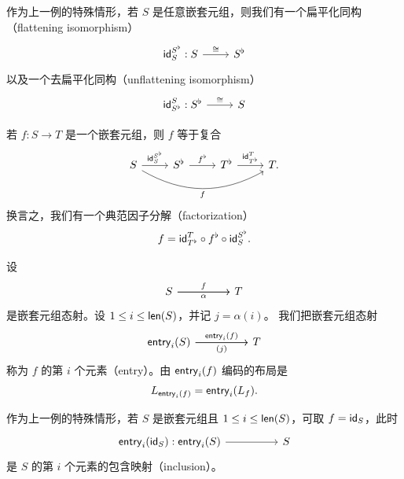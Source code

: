 \begin{example}[扁平化]\label{definitionofflatteningisomorphisms}
    作为上一例的特殊情形，若 $S$ 是任意嵌套元组，则我们有一个扁平化同构（flattening isomorphism）
    \[\begin{tikzcd}
    \id_S^{S^\flat} : S \ar[r,"\cong"] & S^\flat
    \end{tikzcd} \]
    以及一个去扁平化同构（unflattening isomorphism）
    \[\begin{tikzcd}
    \id_{S^\flat}^{S} : S^\flat \ar[r,"\cong"] & S
    \end{tikzcd}\]
\end{example}

\begin{observation}
    若 $f:S \to T$ 是一个嵌套元组，则 $f$ 等于复合
    \[ \begin{tikzcd}
    S \ar[r,"\id_S^{S^\flat}"] \ar[rrr,swap,bend right = 30, "f"] & S^\flat \ar[r,"f^\flat"] & T^\flat \ar[r,"\id_{T^\flat}^T"] & T.
    \end{tikzcd} \]
    换言之，我们有一个典范因子分解（factorization）
    \[
    f = \mathsf{id}_{T^\flat}^T \circ f^\flat \circ \mathsf{id}_S^{S^\flat}.
    \]
\end{observation}

\begin{example}[元素]\label{definitionofentriesofnestedtuplemorphisms}
    设
    \[ \begin{tikzcd}
S \ar[rr,"f"] \ar[rr,swap,"\alpha"] & & T
    \end{tikzcd}\]
    是嵌套元组态射。设 $1 \leq i \leq \mathsf{len}(S)$，并记 $j = \alpha(i)$。
    我们把嵌套元组态射
    \[ \begin{tikzcd}
    \entry_i(S) \ar[rr,"\entry_i(f)"] \ar[rr,swap,"(j)"]& & T
    \end{tikzcd} \]
    称为 $f$ 的第 $i$ 个元素（entry）。由 $\mathsf{entry}_i(f)$ 编码的布局是
    \[
    L_{\mathsf{entry}_i(f)} = \mathsf{entry}_i(L_f) .
    \]
\end{example}

\begin{example}[元素包含]
    作为上一例的特殊情形，若 $S$ 是嵌套元组且 $1 \leq i \leq \mathsf{len}(S)$，可取 $f = \mathsf{id}_S$，此时
    \[ \begin{tikzcd}
\entry_i(\id_S):\entry_i(S) \ar[rr] & & S
    \end{tikzcd}\]
    是 $S$ 的第 $i$ 个元素的包含映射（inclusion）。
\end{example}

